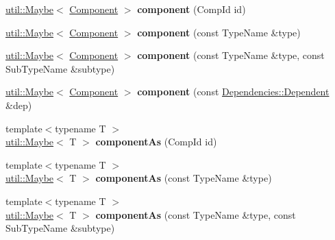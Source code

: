 \begin{DoxyCompactItemize}
\hyperlink{classtheoria_1_1util_1_1Maybe}{util\+::\+Maybe}$<$ \hyperlink{classtheoria_1_1core_1_1Component}{Component} $>$ {\bfseries component} (Comp\+Id id)
\item 
\mbox{\label{classtheoria_1_1core_1_1Registry_a7daaf0e52575c5dfbdb33c81953142f5}} 
\hyperlink{classtheoria_1_1util_1_1Maybe}{util\+::\+Maybe}$<$ \hyperlink{classtheoria_1_1core_1_1Component}{Component} $>$ {\bfseries component} (const Type\+Name \&type)
\item 
\mbox{\label{classtheoria_1_1core_1_1Registry_a5a3cafd6ebd46a88fb5afb877a4b04ad}} 
\hyperlink{classtheoria_1_1util_1_1Maybe}{util\+::\+Maybe}$<$ \hyperlink{classtheoria_1_1core_1_1Component}{Component} $>$ {\bfseries component} (const Type\+Name \&type, const Sub\+Type\+Name \&subtype)
\item 
\mbox{\label{classtheoria_1_1core_1_1Registry_a535f463285f3232258573c4e8ae2d9f9}} 
\hyperlink{classtheoria_1_1util_1_1Maybe}{util\+::\+Maybe}$<$ \hyperlink{classtheoria_1_1core_1_1Component}{Component} $>$ {\bfseries component} (const \hyperlink{structtheoria_1_1core_1_1Dependencies_1_1Dependent}{Dependencies\+::\+Dependent} \&dep)
\item 
\mbox{\label{classtheoria_1_1core_1_1Registry_aea2d62c83c04fddd8959bed80c556ca3}} 
{\footnotesize template$<$typename T $>$ }\\\hyperlink{classtheoria_1_1util_1_1Maybe}{util\+::\+Maybe}$<$ T $>$ {\bfseries component\+As} (Comp\+Id id)
\item 
\mbox{\label{classtheoria_1_1core_1_1Registry_a90b05bb2e88d6bed56173d74e4e96802}} 
{\footnotesize template$<$typename T $>$ }\\\hyperlink{classtheoria_1_1util_1_1Maybe}{util\+::\+Maybe}$<$ T $>$ {\bfseries component\+As} (const Type\+Name \&type)
\item 
\mbox{\label{classtheoria_1_1core_1_1Registry_a4140c9c7405974759ee43eb07a05a087}} 
{\footnotesize template$<$typename T $>$ }\\\hyperlink{classtheoria_1_1util_1_1Maybe}{util\+::\+Maybe}$<$ T $>$ {\bfseries component\+As} (const Type\+Name \&type, const Sub\+Type\+Name \&subtype)

\end{DoxyCompactItemize}

